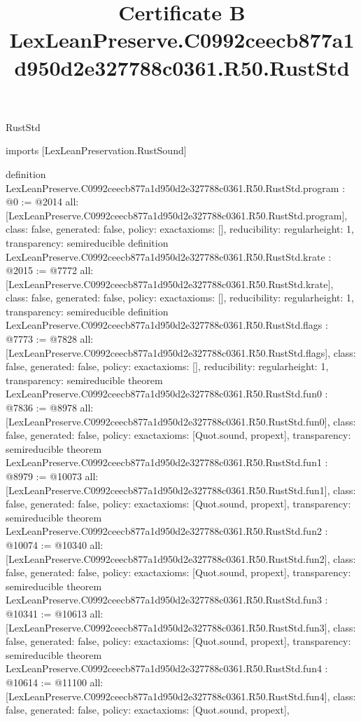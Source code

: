 \begin{lexlean}{RustStd}
\title{Certificate B LexLeanPreserve.C0992ceecb877a1d950d2e327788c0361.R50.RustStd}
\begin{coremodule}
imports [LexLeanPreservation.RustSound]

definition LexLeanPreserve.C0992ceecb877a1d950d2e327788c0361.R50.RustStd.program : @0 := @2014 {
  all: [LexLeanPreserve.C0992ceecb877a1d950d2e327788c0361.R50.RustStd.program],
  class: false,
  generated: false,
  policy: exact{axioms: []},
  reducibility: regular{height: 1},
  transparency: semireducible
}
definition LexLeanPreserve.C0992ceecb877a1d950d2e327788c0361.R50.RustStd.krate : @2015 := @7772 {
  all: [LexLeanPreserve.C0992ceecb877a1d950d2e327788c0361.R50.RustStd.krate],
  class: false,
  generated: false,
  policy: exact{axioms: []},
  reducibility: regular{height: 1},
  transparency: semireducible
}
definition LexLeanPreserve.C0992ceecb877a1d950d2e327788c0361.R50.RustStd.flags : @7773 := @7828 {
  all: [LexLeanPreserve.C0992ceecb877a1d950d2e327788c0361.R50.RustStd.flags],
  class: false,
  generated: false,
  policy: exact{axioms: []},
  reducibility: regular{height: 1},
  transparency: semireducible
}
theorem LexLeanPreserve.C0992ceecb877a1d950d2e327788c0361.R50.RustStd.fun0 : @7836 := @8978 {
  all: [LexLeanPreserve.C0992ceecb877a1d950d2e327788c0361.R50.RustStd.fun0],
  class: false,
  generated: false,
  policy: exact{axioms: [Quot.sound, propext]},
  transparency: semireducible
}
theorem LexLeanPreserve.C0992ceecb877a1d950d2e327788c0361.R50.RustStd.fun1 : @8979 := @10073 {
  all: [LexLeanPreserve.C0992ceecb877a1d950d2e327788c0361.R50.RustStd.fun1],
  class: false,
  generated: false,
  policy: exact{axioms: [Quot.sound, propext]},
  transparency: semireducible
}
theorem LexLeanPreserve.C0992ceecb877a1d950d2e327788c0361.R50.RustStd.fun2 : @10074 := @10340 {
  all: [LexLeanPreserve.C0992ceecb877a1d950d2e327788c0361.R50.RustStd.fun2],
  class: false,
  generated: false,
  policy: exact{axioms: [Quot.sound, propext]},
  transparency: semireducible
}
theorem LexLeanPreserve.C0992ceecb877a1d950d2e327788c0361.R50.RustStd.fun3 : @10341 := @10613 {
  all: [LexLeanPreserve.C0992ceecb877a1d950d2e327788c0361.R50.RustStd.fun3],
  class: false,
  generated: false,
  policy: exact{axioms: [Quot.sound, propext]},
  transparency: semireducible
}
theorem LexLeanPreserve.C0992ceecb877a1d950d2e327788c0361.R50.RustStd.fun4 : @10614 := @11100 {
  all: [LexLeanPreserve.C0992ceecb877a1d950d2e327788c0361.R50.RustStd.fun4],
  class: false,
  generated: false,
  policy: exact{axioms: [Quot.sound, propext]},
}
\end{coremodule}
\end{lexlean}
